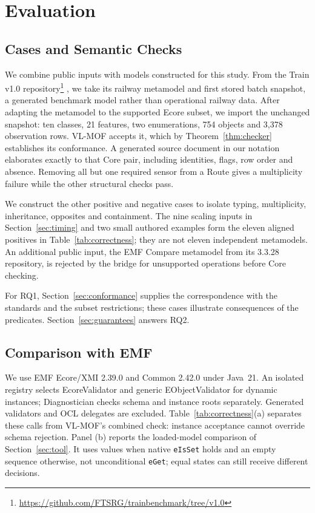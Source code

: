 \section{Evaluation}\label{sec:evaluation}
\subsection{Cases and Semantic Checks}
We combine public inputs with models constructed for this study. From the
Train v1.0 repository\footnote{\url{https://github.com/FTSRG/trainbenchmark/tree/v1.0}}
\cite{szarnyas_etal_2018}, we take its railway metamodel and first stored batch
snapshot, a generated benchmark model rather than operational railway data.
After adapting the metamodel to the supported Ecore subset, we import the
unchanged snapshot: ten classes, 21 features, two enumerations, 754 objects and
3,378 observation rows. VL-MOF accepts it, which by Theorem~\ref{thm:checker}
establishes its conformance. A generated source document in our notation elaborates exactly to
that Core pair, including identities, flags, row order and absence. Removing all
but one required sensor from a Route gives a multiplicity failure while the
other structural checks pass.

We construct the other positive and negative cases to isolate typing,
multiplicity, inheritance, opposites and containment. The nine scaling inputs
in Section~\ref{sec:timing} and two small authored examples form the eleven
aligned positives in Table~\ref{tab:correctness}; they are not eleven independent
metamodels. An additional public input, the EMF Compare metamodel from its
3.3.28 repository, is rejected by the bridge for unsupported operations before
Core checking.

For RQ1, Section~\ref{sec:conformance} supplies the correspondence with the
standards and the subset restrictions; these cases illustrate consequences of the predicates.
Section~\ref{sec:guarantees} answers RQ2.

\subsection{Comparison with EMF}
We use EMF Ecore/XMI 2.39.0 and Common 2.42.0 under Java~21. An isolated registry selects EcoreValidator and generic
EObjectValidator for dynamic instances; Diagnostician checks schema and instance
roots separately. Generated validators and OCL delegates are excluded.
Table~\ref{tab:correctness}(a) separates these calls from VL-MOF's combined check:
instance acceptance cannot override schema rejection. Panel (b) reports the loaded-model comparison of Section~\ref{sec:tool}.
It uses values when native \texttt{eIsSet} holds and an empty sequence otherwise,
not unconditional \texttt{eGet}; equal states can still receive different decisions.

